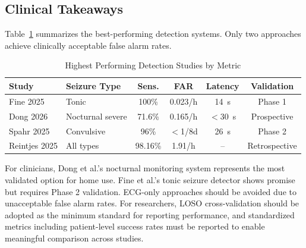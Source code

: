 \subsection{Clinical Takeaways}

Table~\ref{tab:detection-performance} summarizes the best-performing detection systems. Only two approaches achieve clinically acceptable false alarm rates.

\begin{table}[htbp]
\centering
\small
\caption{Highest Performing Detection Studies by Metric}
\label{tab:detection-performance}
\begin{tabular}{llcccc}
\toprule
\textbf{Study} & \textbf{Seizure Type} & \textbf{Sens.} & \textbf{FAR} & \textbf{Latency} & \textbf{Validation} \\
\midrule
Fine 2025 & Tonic & 100\% & 0.023/h & 14~s & Phase 1 \\
Dong 2026 & Nocturnal severe & 71.6\% & 0.165/h & $<$30~s & Prospective \\
Spahr 2025 & Convulsive & 96\% & $<$1/8d & 26~s & Phase 2 \\
Reintjes 2025 & All types & 98.16\% & 1.91/h & -- & Retrospective \\
\bottomrule
\end{tabular}
\end{table}

\noindent For clinicians, Dong et al.'s nocturnal monitoring system represents the most validated option for home use. Fine et al.'s tonic seizure detector shows promise but requires Phase 2 validation. ECG-only approaches should be avoided due to unacceptable false alarm rates. For researchers, LOSO cross-validation should be adopted as the minimum standard for reporting performance, and standardized metrics including patient-level success rates must be reported to enable meaningful comparison across studies.
